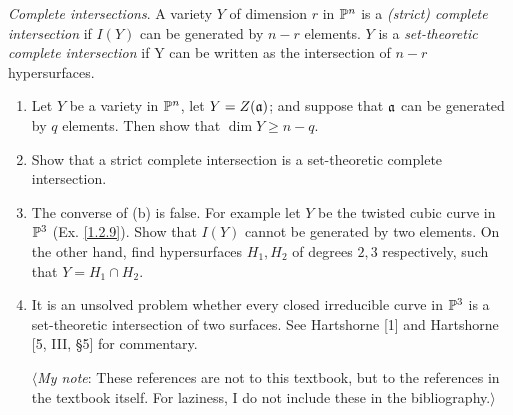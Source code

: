 \label{1.2.17}

\textit{Complete intersections}. A variety $Y$ of dimension $r$ in $\P^n$ is a \textit{(strict) complete intersection} if $I(Y)$ can be generated by $n - r$ elements. $Y$ is a \textit{set-theoretic complete intersection} if Y can be written as the intersection of $n - r$ hypersurfaces.

\begin{enumerate}[label = (\alph*)]
    \item Let $Y$ be a variety in $\P^n$, let $Y = Z(\a)$; and suppose that $\a$ can be generated by $q$ elements. Then show that $\dim Y \geq n - q$.
    
    \item Show that a strict complete intersection is a set-theoretic complete intersection.
    
    \item The converse of (b) is false. For example let $Y$ be the twisted cubic curve in $\P^3$ (Ex. \ref{1.2.9}). Show that $I(Y)$ cannot be generated by two elements. On the other hand, find hypersurfaces $H_1, H_2$ of degrees $2, 3$ respectively, such that $Y = H_1 \cap H_2$.
    
    \item It is an unsolved problem whether every closed irreducible curve in $\P^3$ is a set-theoretic intersection of two surfaces. See Hartshorne [1] and Hartshorne [5, III, §5] for commentary.
    
    $\langle$\textit{My note}: These references are not to this textbook, but to the references in the textbook itself. For laziness, I do not include these in the bibliography.$\rangle$
\end{enumerate}

